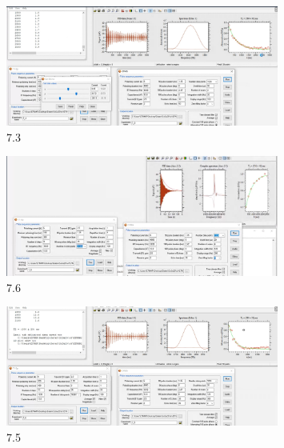     \begin{figure}[H]
        \centering
        \includegraphics[width = 0.8\textwidth]{Screenshot2/7_3.jpg}
        \caption{7.3}
    \end{figure}

    \begin{figure}[H]
        \centering
        \includegraphics[width = 0.8\textwidth]{Screenshot2/7_6.jpg}
        \caption{7.6}
    \end{figure}

    \begin{figure}[H]
        \centering
        \includegraphics[width = 0.8\textwidth]{Screenshot2/7_5.jpg}
        \caption{7.5}
    \end{figure}



